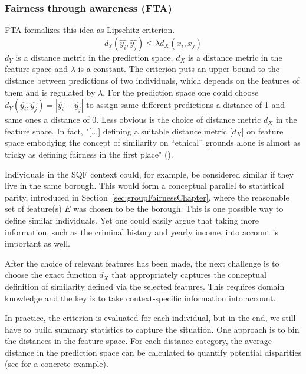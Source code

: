 \subsubsection*{Fairness through awareness (FTA)}
FTA formalizes this idea as Lipschitz criterion. $$d_Y(\hat{y_i}, \hat{y_j}) \leq \lambda {d_X}(x_i, x_j)$$
$d_Y$ is a distance metric in the prediction space, $d_X$ is a distance metric in the feature space and $\lambda$ is a constant.
The criterion puts an upper bound to the distance between predictions of two individuals, which depends on the features of them and is regulated by $\lambda$. For the prediction space one could choose $d_Y(\hat{y_i}, \hat{y_j}) = |\hat{y_i} - \hat{y_j}|$ to assign same different predictions a distance of 1 and same ones a distance of 0. Less obvious is the choice of distance metric $d_X$ in the feature space. In fact, "[...] defining a suitable distance metric [$d_X$] on feature space embodying the concept of similarity on  “ethical” grounds alone is almost as tricky as defining fairness in the first place" (\cite{castelnovo2022}).\par
Individuals in the SQF context could, for example, be considered similar if they live in the same borough. This would form a conceptual parallel to statistical parity, introduced in Section~\ref{sec:groupFairnessChapter}, where the reasonable set of feature(s) \(E\) was chosen to be the borough.
This is one possible way to define similar individuals. Yet one could easily argue that taking more information, such as the criminal history and yearly income, into account is important as well.\par
After the choice of relevant features has been made, the next challenge is to choose the exact function $d_X$ that appropriately captures the conceptual definition of similarity defined via the selected features.
This requires domain knowledge and the key is to take context-specific information into account.\par
In practice, the criterion is evaluated for each individual, but in the end, we still have to build summary statistics to capture the situation. One approach is to bin the distances in the feature space. For each distance category, the average distance in the prediction space can be calculated to quantify potential disparities (see \cite{verma2018} for a concrete example).



